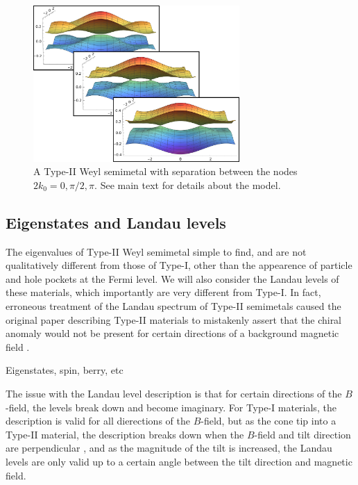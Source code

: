 \begin{figure}[ht]
  \centering
  \includegraphics[width=0.7\textwidth]{figures/movetypeiinode}
  \caption{\label{fig:typeii:move-nodes} A Type-II Weyl semimetal with separation between the nodes \(2k_{0} = 0, \pi/2, \pi \).
    See main text for details about the model.}
\end{figure}


\subsection{Eigenstates and Landau levels}
The eigenvalues of Type-II Weyl semimetal simple to find, and are not qualitatively different from those of Type-I, other than the appearence of particle and hole pockets at the Fermi level.
We will also consider the Landau levels of these materials, which importantly are very different from Type-I.
In fact, erroneous treatment of the Landau spectrum of Type-II semimetals caused the original paper describing Type-II materials to mistakenly assert that the chiral anomaly would not be present for certain directions of a background magnetic field \cite{soluyanovTypeIIWeylSemimetals2015}\cite{sharmaChiralAnomalyLongitudinal2017}.

Eigenstates, spin, berry, etc

The issue with the Landau level description is that for certain directions of the \(B\)-field, the levels break down and become imaginary.
For Type-I materials, the description is valid for all dierections of the \(B\)-field, but as the cone tip into a Type-II material, the description breaks down when the \(B\)-field and tilt direction are perpendicular \cite{sharmaChiralAnomalyLongitudinal2017}, and as the magnitude of the tilt is increased, the Landau levels are only valid up to a certain angle between the tilt direction and magnetic field.

